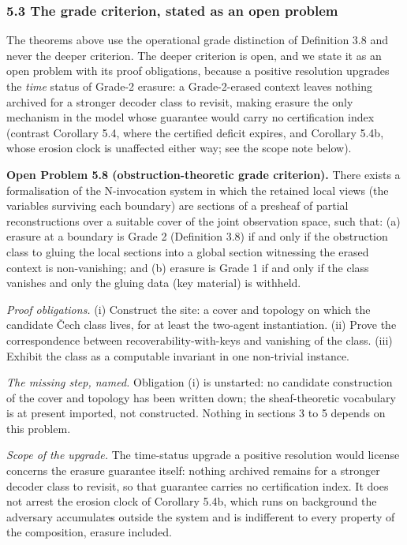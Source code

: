 \documentclass[
  11pt,
]{article}
\begin{document}
\subsubsection{5.3 The grade criterion, stated as an open
problem}\label{the-grade-criterion-stated-as-an-open-problem}

The theorems above use the operational grade distinction of Definition
3.8 and never the deeper criterion. The deeper criterion is open, and we
state it as an open problem with its proof obligations, because a
positive resolution upgrades the \emph{time} status of Grade-2 erasure:
a Grade-2-erased context leaves nothing archived for a stronger decoder
class to revisit, making erasure the only mechanism in the model whose
guarantee would carry no certification index (contrast Corollary 5.4,
where the certified deficit expires, and Corollary 5.4b, whose erosion
clock is unaffected either way; see the scope note below).

\textbf{Open Problem 5.8 (obstruction-theoretic grade criterion).} There
exists a formalisation of the N-invocation system in which the retained
local views (the variables surviving each boundary) are sections of a
presheaf of partial reconstructions over a suitable cover of the joint
observation space, such that: (a) erasure at a boundary is Grade 2
(Definition 3.8) if and only if the obstruction class to gluing the
local sections into a global section witnessing the erased context is
non-vanishing; and (b) erasure is Grade 1 if and only if the class
vanishes and only the gluing data (key material) is withheld.

\emph{Proof obligations.} (i) Construct the site: a cover and topology
on which the candidate Čech class lives, for at least the two-agent
instantiation. (ii) Prove the correspondence between
recoverability-with-keys and vanishing of the class. (iii) Exhibit the
class as a computable invariant in one non-trivial instance.

\emph{The missing step, named.} Obligation (i) is unstarted: no
candidate construction of the cover and topology has been written down;
the sheaf-theoretic vocabulary is at present imported, not constructed.
Nothing in sections 3 to 5 depends on this problem.

\emph{Scope of the upgrade.} The time-status upgrade a positive
resolution would license concerns the erasure guarantee itself: nothing
archived remains for a stronger decoder class to revisit, so that
guarantee carries no certification index. It does not arrest the erosion
clock of Corollary 5.4b, which runs on background the adversary
accumulates outside the system and is indifferent to every property of
the composition, erasure included.
\end{document}

